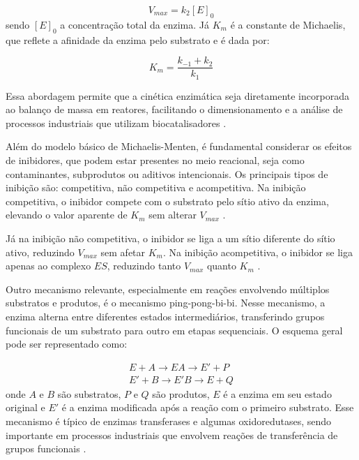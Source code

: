 \documentclass[12pt,oneside]{report}
\begin{document}
\begin{equation}
    V_{max} = k_2[E]_0
\end{equation}
sendo $[E]_0$ a concentração total da enzima. Já $K_m$ é a constante de Michaelis, que reflete a afinidade da enzima pelo substrato e é dada por:

\begin{equation}
    K_m = \frac{k_{-1} + k_2}{k_1}
\end{equation}

Essa abordagem permite que a cinética enzimática seja diretamente incorporada ao balanço de massa em reatores, facilitando o dimensionamento e a análise de processos industriais que utilizam biocatalisadores \cite{FOGLER_2016}.

Além do modelo básico de Michaelis-Menten, é fundamental considerar os efeitos de inibidores, que podem estar presentes no meio reacional, seja como contaminantes, subprodutos ou aditivos intencionais. Os principais tipos de inibição são: competitiva, não competitiva e acompetitiva. Na inibição competitiva, o inibidor compete com o substrato pelo sítio ativo da enzima, elevando o valor aparente de
$K_m$ sem alterar $V_{max}$ \cite{FOGLER_2016}.

Já na inibição não competitiva, o inibidor se liga a um sítio diferente do sítio ativo, reduzindo $V_{max}$ sem afetar $K_m$. Na inibição acompetitiva, o inibidor se liga apenas ao complexo $ES$, reduzindo tanto $V_{max}$ quanto $K_m$ \cite{FOGLER_2016}.


Outro mecanismo relevante, especialmente em reações envolvendo múltiplos substratos e produtos, é o mecanismo ping-pong-bi-bi. Nesse mecanismo, a enzima alterna entre diferentes estados intermediários, transferindo grupos funcionais de um substrato para outro em etapas sequenciais. O esquema geral pode ser representado como:

\begin{equation}
    \begin{aligned}
        E + A \rightarrow EA \rightarrow E' + P \\
        E' + B \rightarrow E'B \rightarrow E + Q
    \end{aligned}
\end{equation}
onde $A$ e $B$ são substratos, $P$ e $Q$ são produtos, $E$ é a enzima em seu estado original e $E'$ é a enzima modificada após a reação com o primeiro substrato. Esse mecanismo é típico de enzimas transferases e algumas oxidoredutases, sendo importante em processos industriais que envolvem reações de transferência de grupos funcionais \cite{FOGLER_2016}.
\end{document}
